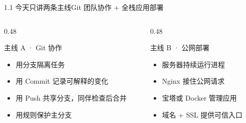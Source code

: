 
\begin{frame}{1.1 今天只讲两条主线}{Git 团队协作 + 全栈应用部署}
  \begin{columns}[T]
    \begin{column}{0.48\textwidth}
      \begin{block}{主线 A · Git 协作}
        \begin{itemize}
          \item 用分支隔离任务
          \item 用 Commit 记录可解释的变化
          \item 用 Push 共享分支，同伴检查后合并
          \item 用规则保护主分支
        \end{itemize}
      \end{block}
    \end{column}
    \begin{column}{0.48\textwidth}
      \begin{block}{主线 B · 公网部署}
        \begin{itemize}
          \item 服务器持续运行进程
          \item Nginx 接住公网请求
          \item 宝塔或 Docker 管理应用
          \item 域名 + SSL 提供可信入口
        \end{itemize}
      \end{block}
    \end{column}
  \end{columns}
\end{frame}

